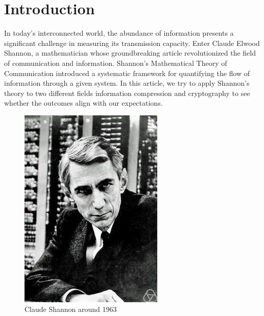\section{Introduction}

In today's interconnected world, the abundance of information presents a significant challenge in measuring its transmission capacity. Enter Claude Elwood Shannon, a mathematician whose groundbreaking article revolutionized the field of communication and information. Shannon's Mathematical Theory of Communication introduced a systematic framework for quantifying the flow of information through a given system. In this article, we try to apply Shannon's theory to two different fields information compression and cryptography to see whether the outcomes align with our expectations.

\begin{figure}[!h]
\centering
\includegraphics[scale=0.7]{images/shanon.jpg}
\caption{Claude Shannon around 1963 \cite{wiki_sha}}
\label{shannon}
\end{figure}

\newpage